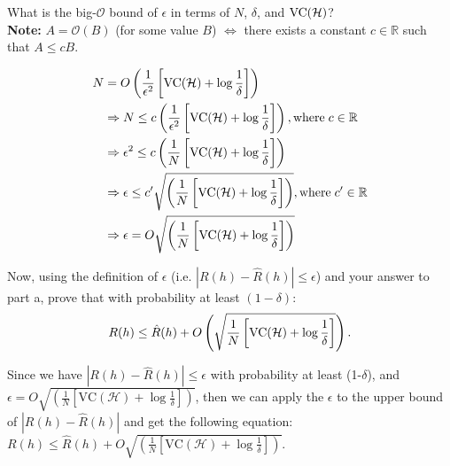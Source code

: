 \documentclass[11pt,addpoints,answers]{exam}
\begin{document}
\begin{questions}
\begin{parts}
    \begin{subparts}
    \subpart[2] What is the big-$\mathcal{O}$ bound of $\epsilon$ in terms of $N$, $\delta$, and $\text{VC}(\mathcal{H})$? \\ 
    \textbf{Note:} $A = \mathcal{O}(B)$ (for some value $B$)  $\Leftrightarrow$ there exists a constant $c \in \mathbb{R}$ such that $A \le cB$.
    
    \begin{your_solution}[height=8cm]
		\begin{align}
			N &= O \left( \frac{1}{\epsilon^2} \left[ \text{VC}(\mathcal{H}) + \log \frac{1}{\delta} \right] \right) \\
			&\Rightarrow N \leq c \left( \frac{1}{\epsilon^2} \left[ \text{VC}(\mathcal{H}) + \log \frac{1}{\delta} \right] \right), \text{where} \hspace{1mm} c \in \mathbb{R}  \\
			&\Rightarrow \epsilon^2 \leq c \left( \frac{1}{N} \left[ \text{VC}(\mathcal{H}) + \log \frac{1}{\delta} \right] \right) \\
			&\Rightarrow \epsilon \leq c' \sqrt{\left( \frac{1}{N} \left[ \text{VC}(\mathcal{H}) + \log \frac{1}{\delta} \right] \right)}, \text{where} \hspace{1mm} c' \in \mathbb{R}  \\
			&\Rightarrow \epsilon = O \sqrt{\left( \frac{1}{N} \left[ \text{VC}(\mathcal{H}) + \log \frac{1}{\delta} \right] \right)}
		\end{align}           
    \end{your_solution}

    \newpage
    
    \subpart[2] Now, using the definition of $\epsilon$ (i.e. $|R(h) - \hat{R}(h)| \le \epsilon$) and your answer to part a, prove that with probability at least $(1-\delta)$: $$R(h) \le \hat{R}(h) + O\left(\sqrt{\frac{1}{N} \left[\text{VC}(\mathcal{H}) + \log\frac{1}{\delta} \right]} \right).$$
    \begin{your_solution}[height=8cm]
        Since we have $|R(h) - \hat{R}(h)| \leq \epsilon$ with probability at least (1-$\delta$), and $\epsilon = O \sqrt{\left( \frac{1}{N} \left[ \text{VC}(\mathcal{H}) + \log \frac{1}{\delta} \right] \right)}$, then we can apply the $\epsilon$ to the upper bound of $|R(h) - \hat{R}(h)|$ and get the following equation: $R(h) \leq \hat{R}(h) + O \sqrt{\left( \frac{1}{N} \left[ \text{VC}(\mathcal{H}) + \log \frac{1}{\delta} \right] \right)}$.
    \end{your_solution}
    \end{subparts}


\end{parts}
\end{questions}
\end{document}
